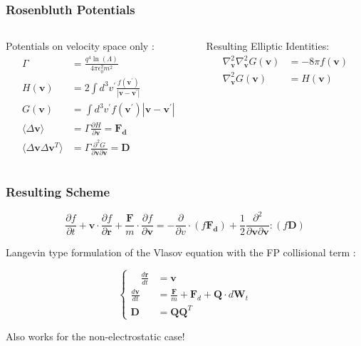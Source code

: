 \documentclass[10pt]{beamer}
\begin{document}
 \begin{frame}
 \frametitle{Rosenbluth Potentials \cite{rosenbluth}}

	 \begin{columns}[t] 
		 \begin{column}{0.5\textwidth}
 Potentials on velocity space only \cite{PlasmaKineticTheory}:
 \begin{align}
	 \Gamma   &= \frac{q^4 \ln(\Lambda)}{4 \pi \epsilon_0^2 m^2} \\[9pt]
	 H(\bm v) &=  2 \int d^3 v^\prime \frac{f(\bm{v^\prime})}{|\bm v - \bm{v^\prime}|} \\[9pt]
	 G(\bm v) &=  \int d^3 v^\prime f(\bm{v^\prime}) |\bm v - \bm{v^\prime}| \\[9pt]
	 \langle \Delta\mathbf{v} \rangle &=  \Gamma \frac{\partial H}{\partial \bm v} = \bm{F_d} \\[9pt]
	 \langle \Delta\mathbf{v}\Delta\mathbf{v}^T \rangle &=  \Gamma \frac{\partial^2 G}{\partial \bm v \partial \bm v} = \bm D
 \end{align}	
 \end{column}
 \hspace{-8pt}
 \vrule{}
 \hspace{+7pt}
		 \begin{column}{0.4\textwidth}
 Resulting Elliptic Identities: \\[6pt]
 \begin{align}
	 \nabla_{\bm{v}}^2 \nabla_{\bm{v}}^2 G(\bm v) &=  -8 \pi f(\bm v) \\[21pt]
	 \nabla_{\bm{v}}^2 G(\bm v) &= H(\bm v)
 \end{align}	
 \end{column}
\end{columns}

 \end{frame}

\begin{frame}
\frametitle{Resulting Scheme \cite{stoel}}

\begin{equation}
\frac{\partial f}{\partial t} + \bm{v} \cdot \frac{\partial f}{\partial \bm r} + \frac{\bm{F}}{m} \cdot \frac{\partial f}{\partial \bm v} = -\frac{\partial}{\partial v} \cdot (f \bm{F_d}) + \frac{1}{2} \frac{\partial^2}{\partial \mathbf v \partial \mathbf v} : (f \bm D)
\end{equation} \newline

Langevin type formulation of the Vlasov equation with the FP collisional term \cite{Risken1984FokkerPlanckE}:

\begin{equation}
\left\{
 \begin{align}
	 \quad \frac{d \bm r}{dt} &= \bm v \\
	 \frac{d \bm v}{dt}  &=  \frac{\bm F}{m} + \bm F_d + \bm Q \cdot d\bm W_t \\
	 \bm D &= \bm Q \bm Q^T
 \end{align}	
\right.
\end{equation}

Also works for the non-electrostatic case!


\end{frame}
\end{document}
